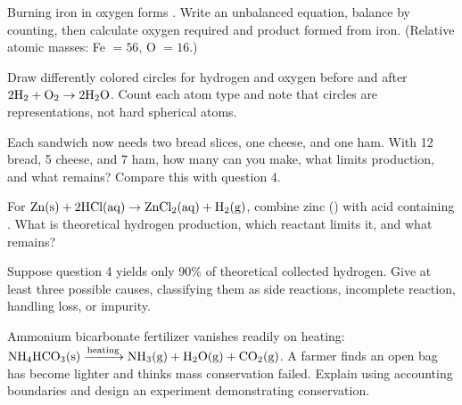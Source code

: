 \begin{sikaoti}
\item Burning iron in oxygen forms . Write an unbalanced equation, balance by counting, then calculate oxygen required and product formed from  iron. (Relative atomic masses: Fe $=56$, O $=16$.)
\item Draw differently colored circles for hydrogen and oxygen before and after $2\mathrm{H_2} + \mathrm{O_2} \rightarrow \mathrm{2H_2O}$. Count each atom type and note that circles are representations, not hard spherical atoms.
\item Each sandwich now needs two bread slices, one cheese, and one ham. With 12 bread, 5 cheese, and 7 ham, how many can you make, what limits production, and what remains? Compare this with question 4.
\item For $\mathrm{Zn(s)} + \mathrm{2HCl(aq)} \rightarrow \mathrm{ZnCl_2(aq)} + \mathrm{H_2(g)}$, combine  zinc () with acid containing  . What is theoretical hydrogen production, which reactant limits it, and what remains?
\item Suppose question 4 yields only 90\% of theoretical collected hydrogen. Give at least three possible causes, classifying them as side reactions, incomplete reaction, handling loss, or impurity.
\item Ammonium bicarbonate fertilizer vanishes readily on heating: $\mathrm{NH_4HCO_3(s)} \xrightarrow{\text{heating}} \mathrm{NH_3(g)} + \mathrm{H_2O(g)} + \mathrm{CO_2(g)}$. A farmer finds an open bag has become lighter and thinks mass conservation failed. Explain using accounting boundaries and design an experiment demonstrating conservation.
\end{sikaoti}
